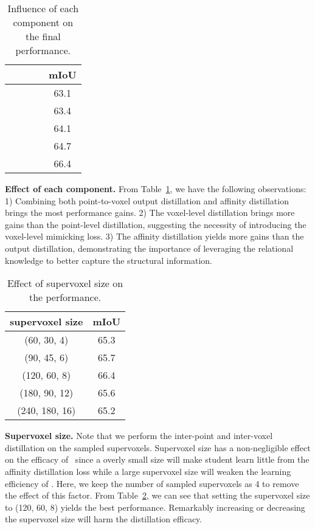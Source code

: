 \begin{table}[!t]
\caption{Influence of each component on the final performance.}
\label{each_component_table}
\centering
\vskip -0.3cm
\small{
\begin{tabular}{c|c|c|c|c}
\hline
 &  &  &  & mIoU \\
\hline
        &         &         &         &  63.1 \\
 &         &         &         &  63.4 \\
 &  &         &         &  64.1 \\
 &  &  &         &  64.7 \\
 &  &  &  &  66.4 \\
\hline
\end{tabular}
}
\vspace{-4ex}
\end{table}


\noindent \textbf{Effect of each component.} From Table~\ref{each_component_table}, we have the following observations: 1) Combining both point-to-voxel output distillation and affinity distillation brings the most performance gains. 2) The voxel-level distillation brings more gains than the point-level distillation, suggesting the necessity of introducing the voxel-level mimicking loss. 3) The affinity distillation yields more gains than the output distillation, demonstrating the importance of leveraging the relational knowledge to better capture the structural information. 

\begin{table}[!t]
\caption{Effect of supervoxel size on the performance.}
\label{supervoxel_size_table}
\centering
\vskip -0.3cm
\small{
\begin{tabular}{c|c}
\hline
supervoxel size & mIoU \\
\hline
(60, 30, 4) & 65.3 \\
\hline
(90, 45, 6) & 65.7 \\
\hline
(120, 60, 8) & 66.4 \\
\hline
(180, 90, 12) & 65.6 \\
\hline
(240, 180, 16) & 65.2 \\
\hline
\end{tabular}
}
\vspace{-3ex}
\end{table}

\noindent \textbf{Supervoxel size.} Note that we perform the inter-point and inter-voxel distillation on the sampled supervoxels. Supervoxel size has a non-negligible effect on the efficacy of \algorithmname~since a overly small size will make student learn little from the affinity distillation loss while a large supervoxel size will weaken the learning efficiency of \algorithmname. Here, we keep the number of sampled supervoxels as 4 to remove the effect of this factor. From Table~\ref{supervoxel_size_table}, we can see that setting the supervoxel size to (120, 60, 8) yields the best performance. Remarkably increasing or decreasing the supervoxel size will harm the distillation efficacy.   



